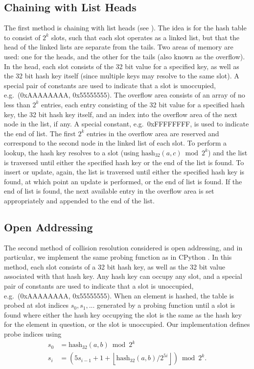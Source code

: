 \documentclass{ucalgthes1}
\theoremstyle{definition}
\newcommand{\floor}[1]{\left\lfloor #1 \right\rfloor}
\newcommand{\hash}{\textrm{hash}_{\textrm{32}}}
\begin{document}
\subsection{Chaining with List Heads}
The first method is chaining with list heads (see \cite[Subsection~11.2]{Cormen2001}).  The idea is for the hash table to consist of $2^k$ slots, such that each slot operates as a linked list, but that the head of the linked lists are separate from the tails.  Two areas of memory are used: one for the heads, and the other for the tails (also known as the overflow).  In the head, each slot consists of the 32 bit value for a specified key, as well as the 32 bit hash key itself (since multiple keys may resolve to the same slot).  A special pair of constants are used to indicate that a slot is unoccupied, e.g.\ (0xAAAAAAAA, 0x55555555).  The overflow area consists of an array of no less than $2^k$ entries, each entry consisting of the 32 bit value for a specified hash key, the 32 bit hash key itself, and an index into the overflow area of the next node in the list, if any.  A special constant, e.g.\ 0xFFFFFFFF, is used to indicate the end of list.  The first $2^k$ entries in the overflow area are reserved and correspond to the second node in the linked list of each slot.  To perform a lookup, the hash key resolves to a slot (using $\hash(a, c) \bmod 2^k$) and the list is traversed until either the specified hash key or the end of the list is found.  To insert or update, again, the list is traversed until either the specified hash key is found, at which point an update is performed, or the end of list is found.  If the end of list is found, the next available entry in the overflow area is set appropriately and appended to the end of the list. 

\subsection{Open Addressing}
\label{subsec:openAddressing}

The second method of collision resolution considered is open addressing, and in particular, we implement the same probing function as in CPython \cite{Kuchling2008}.  In this method, each slot consists of a 32 bit hash key, as well as the 32 bit value associated with that hash key.  Any hash key can occupy any slot, and a special pair of constants are used to indicate that a slot is unoccupied, e.g.\ (0xAAAAAAAA, 0x55555555).   When an element is hashed, the table is probed at slot indices $s_0, s_1, ...$ generated by a probing function until a slot is found where either the hash key occupying the slot is the same as the hash key for the element in question, or the slot is unoccupied.  Our implementation defines probe indices using
\begin{align*}
	s_0 &= \hash(a,b) \bmod 2^k \\
	s_i &= \left( 5s_{i-1} + 1 + \floor{\hash(a,b)/2^{5i}} \right) \bmod 2^k.
\end{align*}
\end{document}
